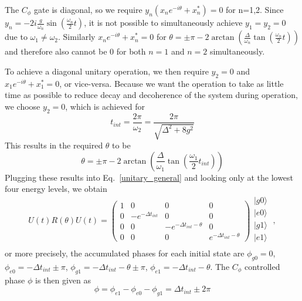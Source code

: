 \documentclass[12pt]{article}
\newcommand{\ket}[1]{\ensuremath{|{#1}\rangle}}
\begin{document}
The $C_{\phi}$ gate is diagonal, so we require $y_n\left(x_n e^{-i\theta}+x_n^*\right) = 0$ for n=1,2. Since $y_n = -2i\frac{g}{\omega_n} \sin\left(\frac{\omega_n}{2}t\right)$, it is not possible to simultaneously achieve $y_1 = y_2 = 0$ due to $\omega_1 \neq \omega_2$. Similarly $x_n e^{-i\theta}+x_n^* = 0$ for $\theta = \pm \pi - 2\arctan\left( \frac{\Delta}{\omega_n} \tan \left( \frac{\omega_n}{2}t \right)\right)$ and therefore also cannot be $0$ for both $n=1$ and $n=2$ simultaneously.

To achieve a diagonal unitary operation, we then require $y_2 = 0$ and $x_1 e^{-i\theta}+x_1^* = 0$, or vice-versa. Because we want the operation to take as little time as possible to reduce decay and decoherence of the system during operation, we choose $y_2=0$, which is achieved for
\begin{equation}
\label{t_int_expression}
t_{int} = \frac{2\pi}{\omega_2} = \frac{2\pi}{\sqrt{\Delta^2+8g^2}}
\end{equation}
This results in the required $\theta$ to be
\begin{equation}
\label{theta_expresssiom}
\theta = \pm \pi - 2\arctan\left( \frac{\Delta}{\omega_1} \tan \left( \frac{\omega_1}{2}t_{int} \right)\right)
\end{equation}
Plugging these results into Eq.~\ref{unitary_general} and looking only at the lowest four energy levels, we obtain
\begin{equation}
U(t)R(\theta)U(t) =
\begin{pmatrix}
1 & 0&0 &0 \\
0& -e^{-\Delta t_{int}} & 0 & 0\\
0& 0 & -e^{-\Delta t_{int}-\theta} &0\\
0& 0& 0& e^{-\Delta t_{int} - \theta}
\end{pmatrix}
\begin{matrix}
     \ket{g0}\\
     \ket{e0}\\
     \ket{g1}\\
     \ket{e1}\\
\end{matrix} \;,
\end{equation}
or more precisely, the accumulated phases for each initial state are $\phi_{g0}=0$, $\phi_{e0}=-\Delta t_{int} \pm \pi$, $\phi_{g1}=-\Delta t_{int} -\theta \pm \pi$, $\phi_{e1}=-\Delta t_{int} -\theta$.
The $C_{\phi}$ controlled phase $\phi$ is then given as
\begin{equation}
\phi = \phi_{e1} - \phi_{e0} - \phi_{g1} = \Delta t_{int} \pm 2\pi
\end{equation}
\end{document}
